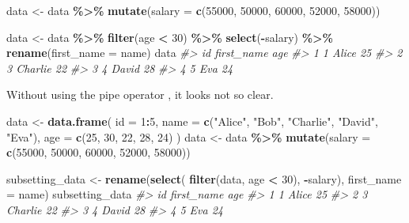 \documentclass[
]{book}
\newenvironment{Shaded}{\begin{snugshade}}{\end{snugshade}}
\newcommand{\AttributeTok}[1]{\textcolor[rgb]{0.13,0.29,0.53}{#1}}
\newcommand{\CommentTok}[1]{\textcolor[rgb]{0.56,0.35,0.01}{\textit{#1}}}
\newcommand{\DecValTok}[1]{\textcolor[rgb]{0.00,0.00,0.81}{#1}}
\newcommand{\FunctionTok}[1]{\textcolor[rgb]{0.13,0.29,0.53}{\textbf{#1}}}
\newcommand{\NormalTok}[1]{#1}
\newcommand{\OtherTok}[1]{\textcolor[rgb]{0.56,0.35,0.01}{#1}}
\newcommand{\SpecialCharTok}[1]{\textcolor[rgb]{0.81,0.36,0.00}{\textbf{#1}}}
\newcommand{\StringTok}[1]{\textcolor[rgb]{0.31,0.60,0.02}{#1}}
\begin{document}
\begin{Shaded}
\begin{Highlighting}[]

\NormalTok{data }\OtherTok{\textless{}{-}}\NormalTok{ data }\SpecialCharTok{\%\textgreater{}\%}
  \FunctionTok{mutate}\NormalTok{(}\AttributeTok{salary =} \FunctionTok{c}\NormalTok{(}\DecValTok{55000}\NormalTok{, }\DecValTok{50000}\NormalTok{, }\DecValTok{60000}\NormalTok{, }\DecValTok{52000}\NormalTok{, }\DecValTok{58000}\NormalTok{))}

\NormalTok{data }\OtherTok{\textless{}{-}}\NormalTok{ data }\SpecialCharTok{\%\textgreater{}\%}
  \FunctionTok{filter}\NormalTok{(age }\SpecialCharTok{\textless{}} \DecValTok{30}\NormalTok{) }\SpecialCharTok{\%\textgreater{}\%}
  \FunctionTok{select}\NormalTok{(}\SpecialCharTok{{-}}\NormalTok{salary) }\SpecialCharTok{\%\textgreater{}\%}
  \FunctionTok{rename}\NormalTok{(}\AttributeTok{first\_name =}\NormalTok{ name)}
\NormalTok{data}
\CommentTok{\#\textgreater{}   id first\_name age}
\CommentTok{\#\textgreater{} 1  1      Alice  25}
\CommentTok{\#\textgreater{} 2  3    Charlie  22}
\CommentTok{\#\textgreater{} 3  4      David  28}
\CommentTok{\#\textgreater{} 4  5        Eva  24}
\end{Highlighting}
\end{Shaded}

Without using the pipe operator , it looks not so clear.

\begin{Shaded}
\begin{Highlighting}[]
\NormalTok{data }\OtherTok{\textless{}{-}} \FunctionTok{data.frame}\NormalTok{(}
  \AttributeTok{id =} \DecValTok{1}\SpecialCharTok{:}\DecValTok{5}\NormalTok{,}
  \AttributeTok{name =} \FunctionTok{c}\NormalTok{(}\StringTok{"Alice"}\NormalTok{, }\StringTok{"Bob"}\NormalTok{, }\StringTok{"Charlie"}\NormalTok{, }\StringTok{"David"}\NormalTok{, }\StringTok{"Eva"}\NormalTok{),}
  \AttributeTok{age =} \FunctionTok{c}\NormalTok{(}\DecValTok{25}\NormalTok{, }\DecValTok{30}\NormalTok{, }\DecValTok{22}\NormalTok{, }\DecValTok{28}\NormalTok{, }\DecValTok{24}\NormalTok{)}
\NormalTok{)}
\NormalTok{data }\OtherTok{\textless{}{-}}\NormalTok{ data }\SpecialCharTok{\%\textgreater{}\%}
  \FunctionTok{mutate}\NormalTok{(}\AttributeTok{salary =} \FunctionTok{c}\NormalTok{(}\DecValTok{55000}\NormalTok{, }\DecValTok{50000}\NormalTok{, }\DecValTok{60000}\NormalTok{, }\DecValTok{52000}\NormalTok{, }\DecValTok{58000}\NormalTok{))}


\NormalTok{subsetting\_data }\OtherTok{\textless{}{-}} \FunctionTok{rename}\NormalTok{(}\FunctionTok{select}\NormalTok{(}
                          \FunctionTok{filter}\NormalTok{(data, age }\SpecialCharTok{\textless{}} \DecValTok{30}\NormalTok{), }\SpecialCharTok{{-}}\NormalTok{salary),}
                          \AttributeTok{first\_name =}\NormalTok{ name)}
\NormalTok{subsetting\_data}
\CommentTok{\#\textgreater{}   id first\_name age}
\CommentTok{\#\textgreater{} 1  1      Alice  25}
\CommentTok{\#\textgreater{} 2  3    Charlie  22}
\CommentTok{\#\textgreater{} 3  4      David  28}
\CommentTok{\#\textgreater{} 4  5        Eva  24}
\end{Highlighting}
\end{Shaded}
\end{document}
